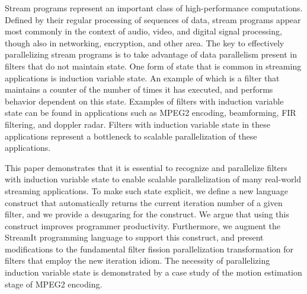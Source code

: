 Stream programs represent an important class of high-performance
computations. Deﬁned by their regular processing of sequences of data,
stream programs appear most commonly in the context of audio, video,
and digital signal processing, though also in networking, encryption,
and other area. The key to effectively parallelizing stream programs
is to take advantage of data parallelism present in filters that do
not maintain state.  One form of state that is common in streaming
applications is induction variable state.  An example of which is a
filter that maintains a counter of the number of times it has
executed, and performs behavior dependent on this state.  Examples of
filters with induction variable state can be found in applications
such as MPEG2 encoding, beamforming, FIR filtering, and doppler radar.
Filters with induction variable state in these applications represent
a bottleneck to scalable parallelization of these applications.

This paper demonstrates that it is essential to recognize and
parallelize filters with induction variable state to enable scalable
parallelization of many real-world streaming applications.  To make
such state explicit, we define a new language construct that
automatically returns the current iteration number of a given filter,
and we provide a desugaring for the construct.  We argue that using this
construct improves programmer productivity.  Furthermore, we augment
the StreamIt programming language to support this construct, and
present modifications to the fundamental filter fission
parallelization transformation for filters that employ the new
iteration idiom.  The necessity of parallelizing induction variable
state is demonstrated by a case study of the motion estimation stage
of MPEG2 encoding.


